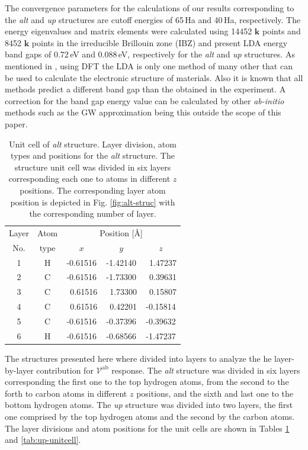 \documentclass[prb,11pt,tightenlines,twocolumn,aps]{revtex4-1}
\begin{document}
The convergence parameters for the calculations of our results corresponding to
the \emph{alt} and \emph{up} structures are cutoff energies of 65\,Ha and
40\,Ha, respectively. The energy eigenvalues and matrix elements were
calculated using 14452 $\mathbf{k}$ points and 8452 $\mathbf{k}$ points in the
irreducible Brillouin zone (IBZ) and present LDA energy band gaps of 0.72\,eV
and 0.088\,eV, respectively for the \emph{alt} and \emph{up} structures. As
mentioned in
\cite{zapataPSB2016}, using DFT the LDA is only one method of many other that
can be used to calculate the electronic structure of materials. Also it is
known that all methods predict a different band gap than the obtained in the
experiment. A correction for the band gap energy value can be calculated by
other \emph{ab-initio} methods such as the GW approximation \cite{onidaRMP02}
being this outside the scope of this paper.



\begin{table}[tb]
\center
\begin{tabular}{ccccc}\\
\hline
Layer & Atom & \multicolumn{3}{c}{Position [\AA]} \\
\cline{3-5}
No. & type & $x$ & $y$ & $z$  \\
\hline
1 & H &  -0.61516 &  -1.42140 & \ 1.47237 \\
2 & C &  -0.61516 &  -1.73300 & \ 0.39631 \\
3 & C & \ 0.61516 & \ 1.73300 & \ 0.15807 \\
4 & C & \ 0.61516 & \ 0.42201 &  -0.15814 \\
5 & C &  -0.61516 &  -0.37396 &  -0.39632 \\
6 & H &  -0.61516 &  -0.68566 &  -1.47237 \\
\hline
\end{tabular}
\caption{Unit cell of \emph{alt} structure. Layer division, atom types and
positions for the \emph{alt} structure. The structure unit cell was divided in
six layers corresponding each one to atoms in different $z$ positions. The
corresponding layer atom position is depicted in Fig. \ref{fig:alt-struc} with
the corresponding number of layer.}
\label{tab:alt-unitcell}
\end{table}

The structures presented here where divided into layers to analyze the he
layer-by-layer contribution for $\mathcal{V}^{\mathrm{ab}}$ response. The
\emph{alt} structure was divided in six layers corresponding the first one to
the top hydrogen atoms, from the second to the forth to carbon atoms in
different $z$ positions, and the sixth and last one to the bottom hydrogen
atoms. The \emph{up} structure was divided into two layers, the first one
comprised by the top hydrogen atoms and the second by the carbon atoms. The
layer divisions and atom positions for the unit cells are shown in Tables
\ref{tab:alt-unitcell} and \ref{tab:up-unitcell}.
\end{document}
